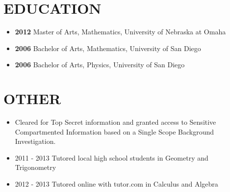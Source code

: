 \documentclass[10pt]{article}
\begin{document}
\section{EDUCATION}\label{education}

\begin{itemize}
\itemsep1pt\parskip0pt
\item
  \textbf{2012} Master of Arts, Mathematics, University of Nebraska at
  Omaha
\item
  \textbf{2006} Bachelor of Arts, Mathematics, University of San Diego
\item
  \textbf{2006} Bachelor of Arts, Physics, University of San Diego
\end{itemize}

\section{OTHER}\label{other}

\begin{itemize}
\itemsep1pt\parskip0pt
\item
  Cleared for Top Secret information and granted access to Sensitive
  Compartmented Information based on a Single Scope Background
  Investigation.
\item
  2011 - 2013 Tutored local high school students in Geometry and
  Trigonometry
\item
  2012 - 2013 Tutored online with tutor.com in Calculus and Algebra
\end{itemize}

\end{document}
